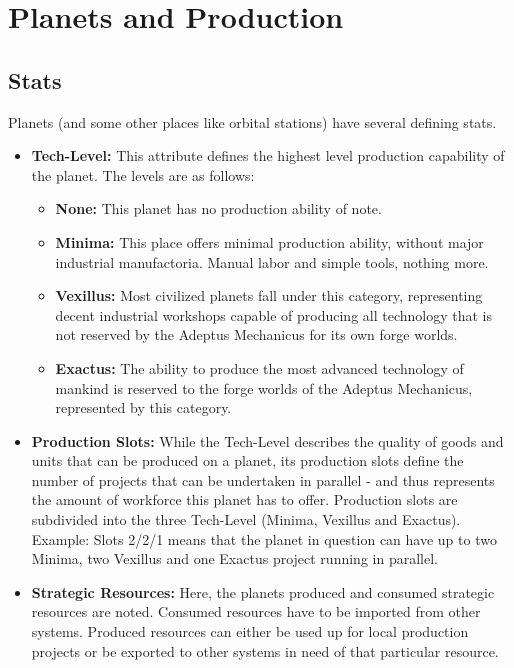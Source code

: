 \section{Planets and Production} 
\subsection{Stats}
Planets (and some other places like orbital stations) have several defining stats. 
\begin{itemize} 
\item \textbf{Tech-Level:} This attribute defines the highest level production capability of the planet. The levels are as follows: 
    \begin{itemize} 
        \item \textbf{None:} This planet has no production ability of note.  
        \item \textbf{Minima:} This place offers minimal production ability, without major industrial manufactoria. Manual labor and simple tools, nothing more. 
        \item \textbf{Vexillus:} Most civilized planets fall under this category, representing decent industrial workshops capable of producing all technology that is not reserved by the Adeptus Mechanicus for its own forge worlds. 
        \item \textbf{Exactus:} The ability to produce the most advanced technology of mankind is reserved to the forge worlds of the Adeptus Mechanicus, represented by this category. 
    \end{itemize} 
\item \textbf{Production Slots:} While the Tech-Level describes the quality of goods and units that can be produced on a planet, its production slots define the number of projects that can be undertaken in parallel - and thus represents the amount of workforce this planet has to offer. Production slots are subdivided into the three Tech-Level (Minima, Vexillus and Exactus). Example: Slots 2/2/1 means that the planet in question can have up to two Minima, two Vexillus and one Exactus project running in parallel. 
\item \textbf{Strategic Resources:} Here, the planets produced and consumed strategic resources are noted. Consumed resources have to be imported from other systems. Produced resources can either be used up for local production projects or be exported to other systems in need of that particular resource. 
\end{itemize} 

